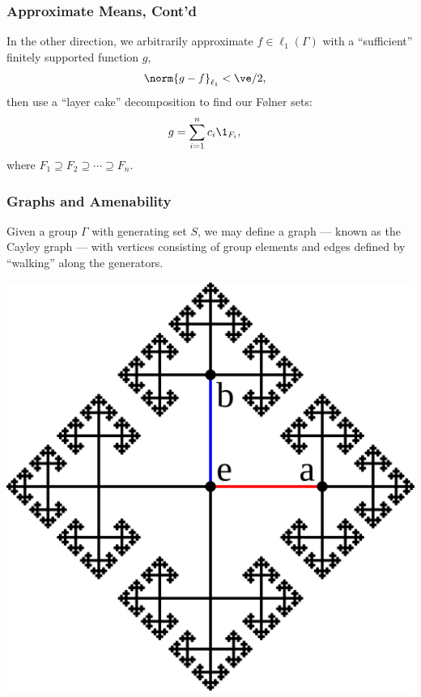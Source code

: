 \documentclass{beamer-custom}
\begin{document}
\begin{frame}
  \frametitle{Approximate Means, Cont'd}
  In the other direction, we arbitrarily approximate $f\in\ell_1\left( \Gamma \right)$ with a ``sufficient'' finitely supported function $g$,
  \begin{align*}
    \norm{g - f}_{\ell_1} &< \ve/2,
  \end{align*}
  then use a ``layer cake'' decomposition to find our Følner sets:
  \begin{align*}
    g &= \sum_{i=1}^{n}c_i\1_{F_i},
  \end{align*}
  where $F_1\supseteq F_2\supseteq \cdots \supseteq F_n$.
\end{frame}
\begin{frame}
  \frametitle{Graphs and Amenability}
  Given a group $\Gamma$ with generating set $S$, we may define a graph --- known as the Cayley graph --- with vertices consisting of group elements and edges defined by ``walking'' along the generators.
  \begin{center}
    \includegraphics[scale=0.075]{images/cayley_graph.png}
  \end{center}
\end{frame}
\end{document}

